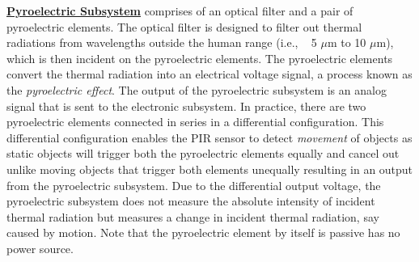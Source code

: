 
\noindent \underline{\bfseries Pyroelectric Subsystem} comprises of an optical filter and a pair of pyroelectric elements. The optical filter is designed to filter out thermal radiations from wavelengths outside the human range (i.e., ~ 5 $\mu$m to 10 $\mu$m), which is then incident on the pyroelectric elements. %
The pyroelectric elements convert the thermal radiation into an electrical voltage signal, a process known as the \textit{pyroelectric effect}. The output of the pyroelectric subsystem is an analog signal that is sent to the electronic subsystem.
In practice, there are two pyroelectric elements connected in series in a differential configuration. This differential configuration enables the PIR sensor to detect \textit{movement} of objects as static objects will trigger both the pyroelectric elements equally and cancel out unlike moving objects that trigger both elements unequally resulting in an output from the pyroelectric subsystem. %
Due to the differential output voltage, the pyroelectric subsystem does not measure the absolute intensity of incident thermal radiation but measures a change in incident thermal radiation, say caused by motion. Note that the pyroelectric element by itself is passive \ie has no power source.


